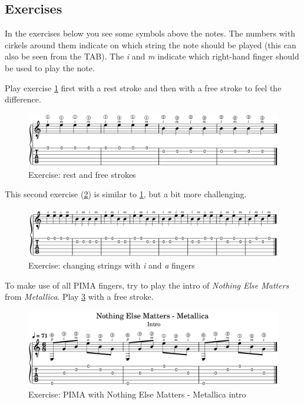 \newpage

\subsection{Exercises}

In the exercises below you see some symbols above the notes. The numbers with cirkels around them indicate on which string the note should be played (this can also be seen from the TAB). The \textit{i} and \textit{m} indicate which right-hand finger should be used to play the note.

Play exercise \ref{fig:exercise_rest_free_stroke} first with a rest stroke and then with a free stroke to feel the difference.

\begin{figure}[h]
    \centering
    \includegraphics[width=\textwidth]{../MuseScore/Guitar/OpenEnVallendeAanslag.png}
    \caption{Exercise: rest and free strokes}
    \label{fig:exercise_rest_free_stroke}
\end{figure}

This second exercise (\ref{fig:exercise_i_m_string_change}) is similar to \ref{fig:exercise_rest_free_stroke}, but a bit more challenging.

\begin{figure}[h]
    \centering
    \includegraphics[width=\textwidth]{../MuseScore/Guitar/TwoStringAlternating.png}
    \caption{Exercise: changing strings with \textit{i} and \textit{a} fingers}
    \label{fig:exercise_i_m_string_change}
\end{figure}

To make use of all PIMA fingers, try to play the intro of \textit{Nothing Else Matters} from \textit{Metallica}. Play \ref{fig:exercise_nothing_else_matters_metallica_intro_pima} with a free stroke.

\begin{figure}[h]
    \centering
    \includegraphics[width=\textwidth]{../MuseScore/Guitar/NothinElseMatters_Metallica_Intro.png}
    \caption{Exercise: PIMA with Nothing Else Matters - Metallica intro}
    \label{fig:exercise_nothing_else_matters_metallica_intro_pima}
\end{figure}

